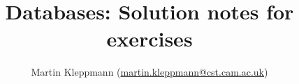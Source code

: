 \documentclass{article}
\begin{document}
\title{Databases: Solution notes for exercises}
\author{Martin Kleppmann (\url{martin.kleppmann@cst.cam.ac.uk})}
\date{}
\maketitle


\end{document}
